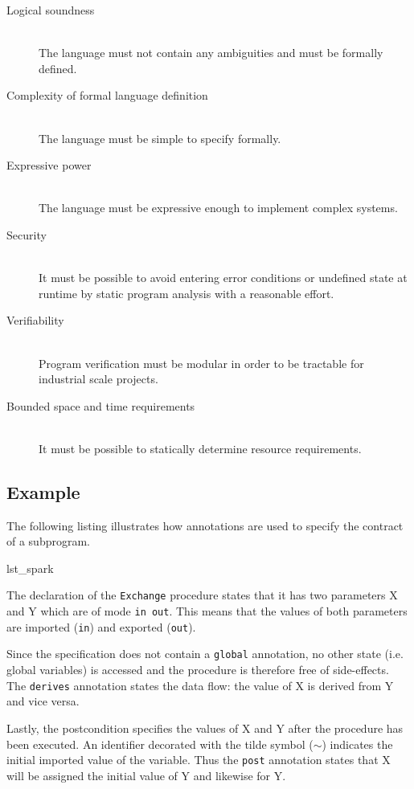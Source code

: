 \begin{description}
	\item[Logical soundness] \hfill \\
		The language must not contain any ambiguities and must be formally
		defined.
	\item[Complexity of formal language definition] \hfill \\
		The language must be simple to specify formally.
	\item[Expressive power] \hfill \\
		The language must be expressive enough to implement complex systems.
	\item[Security] \hfill \\
		It must be possible to avoid entering error conditions or undefined
		state at runtime by static program analysis with a reasonable effort.
	\item[Verifiability] \hfill \\
		Program verification must be modular in order to be tractable for
		industrial scale projects.
	\item[Bounded space and time requirements] \hfill \\
		It must be possible to statically determine resource requirements.
\end{description}

\subsection{Example}
The following listing illustrates how annotations are used to specify the
contract of a subprogram.


	{lst_spark}

The declaration of the \texttt{Exchange} procedure states that it has two
parameters X and Y which are of mode \texttt{in out}. This means that the values
of both parameters are imported (\texttt{in}) and exported (\texttt{out}).

Since the specification does not contain a \texttt{global} annotation, no other
state (i.e. global variables) is accessed and the procedure is therefore free of
side-effects. The \texttt{derives} annotation states the data flow: the value of
X is derived from Y and vice versa.

Lastly, the postcondition specifies the values of X and Y after the procedure
has been executed. An identifier decorated with the tilde symbol ($\sim$)
indicates the initial imported value of the variable. Thus the \texttt{post}
annotation states that X will be assigned the initial value of Y and likewise
for Y.


